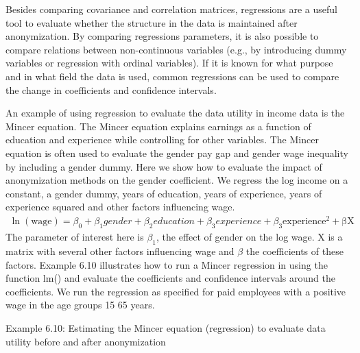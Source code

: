 \documentclass[letterpaper,10pt,english]{sphinxmanual}
\begin{document}
Besides comparing covariance and correlation matrices, regressions are a
useful tool to evaluate whether the structure in the data is maintained
after anonymization. By comparing regressions parameters, it is also
possible to compare relations between non-continuous variables (e.g., by
introducing dummy variables or regression with ordinal variables). If it
is known for what purpose and in what field the data is used, common
regressions can be used to compare the change in coefficients and
confidence intervals.

An example of using regression to evaluate the data utility in income
data is the Mincer equation. The Mincer equation explains earnings as a
function of education and experience while controlling for other
variables. The Mincer equation is often used to evaluate the gender pay
gap and gender wage inequality by including a gender dummy. Here we show
how to evaluate the impact of anonymization methods on the gender
coefficient. We regress the log income on a constant, a gender dummy,
years of education, years of experience, years of experience squared and
other factors influencing wage.
\begin{equation*}
\begin{split}\ln\left( \text{wage} \right) = \beta_{0} + \beta_{1}gender + \beta_{2}education + \beta_{3}experience + \beta_{3}\text{experience}^{2} + \text{βX}\end{split}
\end{equation*}
The parameter of interest here is \(\beta_{1}\), the effect of
gender on the log wage. X is a matrix with several other factors
influencing wage and \(\beta\) the coefficients of these factors.
Example 6.10 illustrates how to run a Mincer regression in  using the
function lm() and evaluate the coefficients and confidence intervals
around the coefficients. We run the regression as specified for paid
employees with a positive wage in the age groups 15 \textendash{} 65 years.

Example 6.10: Estimating the Mincer equation (regression) to evaluate
data utility before and after anonymization
\end{document}
